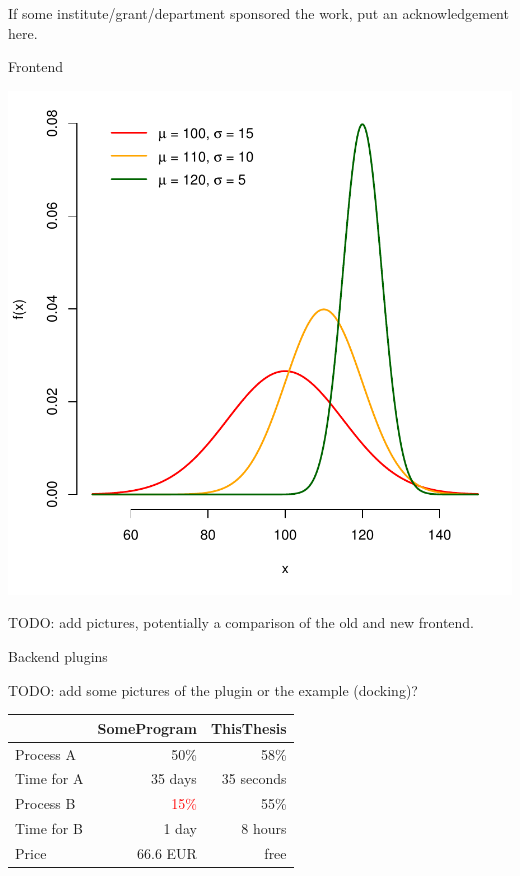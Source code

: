 \documentclass[portrait,a0paper,fontscale=0.25]{baposter}
\begin{document}
\begin{poster}
%
%

\begin{posterbox}[column=0, span=2, name=footer, below=tech,
	textborder=none, headerborder=none, boxheaderheight=0pt,
	boxColorOne=black!3]{}
If some institute/grant/department sponsored the work, put an acknowledgement here.
\end{posterbox}

%
%
%

\begin{posterbox}[column=1, name=result1]{Frontend}
\begin{center}
\includegraphics[width=0.7\linewidth]{img/ukazka-obr02.pdf}
\end{center}

TODO: add pictures, potentially a comparison of the old and new frontend.
\end{posterbox}

\begin{posterbox}[column=1, name=result2, below=result1]{Backend plugins}

TODO: add some pictures of the plugin or the example (docking)?
\begin{center}
\begin{tabular}{lrr}
 & \textbf{SomeProgram} & \textbf{ThisThesis} \\
\hline
Process A & 50\% & 58\% \\
Time for A & 35 days & \textcolor{green!80!black}{35 seconds} \\
Process B & \textcolor{red}{15\%} & 55\% \\
Time for B & 1 day & 8 hours \\
Price & 66.6 EUR & free
\end{tabular}
\end{center}
\end{posterbox}


\end{poster}
\end{document}
